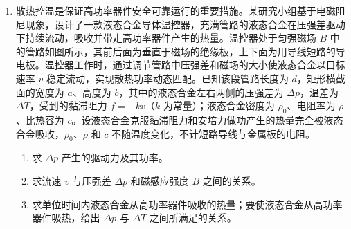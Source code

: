 \documentclass[\gkver]{gaokaozhenti}
\begin{document}
\begin{enumerate}
\item
散热控温是保证高功率器件安全可靠运行的重要措施。某研究小组基于电磁阻尼现象，设计了一款液态合金导体温控器，充满管路的液态合金在压强差驱动下持续流动，吸收并带走高功率器件产生的热量。温控器处于匀强磁场 $B$ 中的管路如图所示，其前后面为垂直于磁场的绝缘板，上下面为用导线短路的导电板。温控器工作时，通过调节管路中压强差和磁场的大小使液态合金以目标速率 $v$ 稳定流动，实现散热功率动态匹配。已知该段管路长度为 $d$，矩形横截面的宽度为 $a$、高度为 $b$，其中的液态合金左右两侧的压强差为 $\Delta p$，温差为 $\Delta T$，受到的黏滞阻力 $f = -kv$（$k$ 为常量）；液态合金密度为 $\rho_{0}$、电阻率为 $\rho$、比热容为 $c$。设液态合金克服黏滞阻力和安培力做功产生的热量完全被液态合金吸收，$\rho_{0}$、$\rho$ 和 $c$ 不随温度变化，不计短路导线与金属板的电阻。
\begin{enumerate}
	\item
	求 $\Delta p$ 产生的驱动力及其功率。
	\item
	求流速 $v$ 与压强差 $\Delta p$ 和磁感应强度 $B$ 之间的关系。
	\item
	求单位时间内液态合金从高功率器件吸收的热量；要使液态合金从高功率器件吸热，给出 $\Delta p$ 与 $\Delta T$ 之间所满足的关系。
\end{enumerate}
\onepicture[align=right, w=6.66cm]{}

\end{enumerate}
\end{document}
